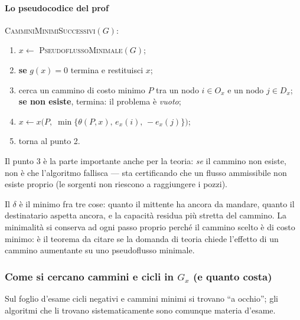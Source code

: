 \documentclass[12pt]{extarticle} %
\begin{document}
\paragraph{Lo pseudocodice del prof}
\textsc{CamminiMinimiSuccessivi}$(G)$:
\begin{enumerate}
    \item $x \leftarrow$ \textsc{PseudoflussoMinimale}$(G)$;
    \item \textbf{se} $g(x) = 0$ termina e restituisci $x$;
    \item cerca un cammino di costo minimo $P$ tra un nodo $i \in O_x$ e un nodo $j \in D_x$; \textbf{se non esiste}, termina: il problema è \emph{vuoto};
    \item $x \leftarrow x\big(P,\; \min\{\theta(P,x),\, e_x(i),\, -e_x(j)\}\big)$;
    \item torna al punto 2.
\end{enumerate}
\noindent Il punto 3 è la parte importante anche per la teoria: \emph{se} il cammino non esiste, non è che l'algoritmo fallisca --- sta certificando che un flusso ammissibile non esiste proprio (le sorgenti non riescono a raggiungere i pozzi).

Il $\delta$ è il minimo fra tre cose: quanto il mittente ha ancora da mandare, quanto il destinatario aspetta ancora, e la capacità residua più stretta del cammino. La minimalità si conserva ad ogni passo proprio perché il cammino scelto è di costo minimo: è il teorema da citare se la domanda di teoria chiede l'effetto di un cammino aumentante su uno pseudoflusso minimale.

\subsubsection{Come si cercano cammini e cicli in $G_x$ (e quanto costa)}
Sul foglio d'esame cicli negativi e cammini minimi si trovano ``a occhio''; gli algoritmi che li trovano sistematicamente sono comunque materia d'esame.
\end{document}
